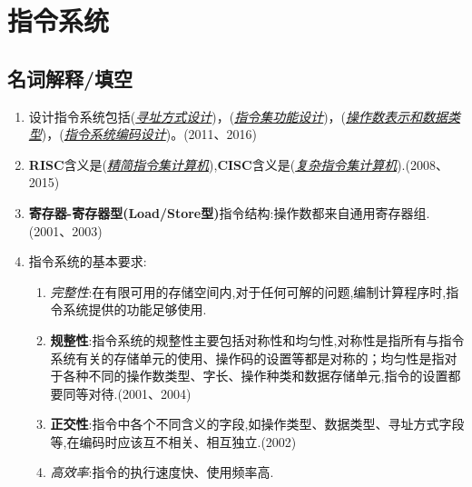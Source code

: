 \documentclass[a4paper]{ctexart}
\newcommand{\blank}[1]{(\emph{\underline{#1}})}
\begin{document}
\section{指令系统}
\subsection{名词解释/填空}
\begin{enumerate}
  \item 设计指令系统包括\blank{寻址方式设计}，\blank{指令集功能设计}，\blank{操作数表示和数据类型}，\blank{指令系统编码设计}。(2011、2016)
  \item \textbf{RISC}含义是\blank{精简指令集计算机},\textbf{CISC}含义是\blank{复杂指令集计算机}.(2008、2015)
  \item \textbf{寄存器-寄存器型(Load/Store型)}指令结构:操作数都来自通用寄存器组.(2001、2003)
  \item 指令系统的基本要求:
  \begin{enumerate}
    \item \emph{完整性}:在有限可用的存储空间内,对于任何可解的问题,编制计算程序时,指令系统提供的功能足够使用.
    \item \textbf{规整性}:指令系统的规整性主要包括对称性和均匀性,对称性是指所有与指令系统有关的存储单元的使用、操作码的设置等都是对称的；均匀性是指对于各种不同的操作数类型、字长、操作种类和数据存储单元,指令的设置都要同等对待.(2001、2004)
    \item \textbf{正交性}:指令中各个不同含义的字段,如操作类型、数据类型、寻址方式字段等,在编码时应该互不相关、相互独立.(2002)
    \item \emph{高效率}:指令的执行速度快、使用频率高.
  \end{enumerate}
\end{enumerate}
\end{document}
